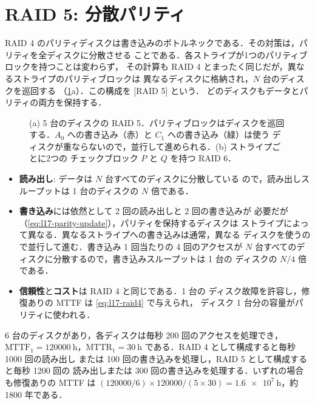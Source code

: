 \documentclass[../main.tex]{subfiles}
\begin{document}
\section{RAID 5: 分散パリティ}
\label{sec:l17-raid5}

RAID 4 のパリティディスクは書き込みのボトルネックである．その対策は，パリティを全ディスクに分散させる
ことである．各ストライプが1つのパリティブロックを持つことは変わらず，
その計算も RAID 4 とまったく同じだが，異なるストライプのパリティブロックは
異なるディスクに格納され，$N$ 台のディスクを巡回する
（\cref{fig:l17-raid5-6}a）．この構成を [RAID 5] という．
どのディスクもデータとパリティの両方を保持する．

\begin{figure}[htbp]
  \centering
  
  \caption{(a) 5 台のディスクの RAID 5．パリティブロックはディスクを巡回
    する．$A_0$ への書き込み（赤）と $C_1$ への書き込み（緑）は使う
    ディスクが重ならないので，並行して進められる．(b) ストライプごとに2つの
    チェックブロック $P$ と $Q$ を持つ RAID 6．}
  \label{fig:l17-raid5-6}
\end{figure}

\begin{itemize}
  \item \textbf{読み出し}: データは $N$ 台すべてのディスクに分散している
    ので，読み出しスループットは 1 台のディスクの $N$ 倍である．
  \item \textbf{書き込み}には依然として 2 回の読み出しと 2 回の書き込みが
    必要だが（\cref{eq:l17-parity-update}），パリティを保持するディスクは
    ストライプによって異なる．異なるストライプへの書き込みは通常，異なる
    ディスクを使うので並行して進む．書き込み 1 回当たりの 4 回のアクセスが
    $N$ 台すべてのディスクに分散するので，書き込みスループットは 1 台の
    ディスクの $N/4$ 倍である．
  \item \textbf{信頼性}と\textbf{コスト}は RAID 4 と同じである．1 台の
    ディスク故障を許容し，修復ありの MTTF は \cref{eq:l17-raid4} で与えられ，
    ディスク 1 台分の容量がパリティに使われる．
\end{itemize}

\begin{example}
  \label{ex:l17-raid5}
  6 台のディスクがあり，各ディスクは毎秒 200 回のアクセスを処理でき，
  $\mathrm{MTTF}_1 = \SI{120000}{\hour}$，$\mathrm{MTTR}_1 =
  \SI{30}{\hour}$ である．RAID 4 として構成すると毎秒 1000 回の読み出し
  または 100 回の書き込みを処理し，RAID 5 として構成すると毎秒 1200 回の
  読み出しまたは 300 回の書き込みを処理する．いずれの場合も修復ありの MTTF
  は $(\num{120000}/6) \times \num{120000}/(5 \times 30) =
  \SI{1.6e7}{\hour}$，約 \num{1800} 年である．
\end{example}
\end{document}
